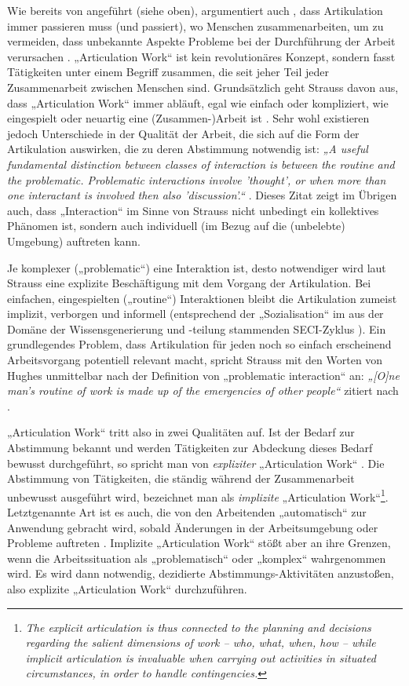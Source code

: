 Wie bereits von \citet{Gerson86} angeführt (siehe oben), argumentiert auch \citeauthor{Strauss88}, dass Artikulation immer passieren muss (und passiert), wo Menschen zusammenarbeiten, um zu vermeiden, dass unbekannte Aspekte Probleme bei der Durchführung der Arbeit verursachen \citep{Strauss88}. „Articulation Work“ ist kein revolutionäres Konzept, sondern fasst Tätigkeiten unter einem Begriff zusammen, die seit jeher Teil jeder Zusammenarbeit zwischen Menschen sind. Grundsätzlich geht Strauss davon aus, dass „Articulation Work“ immer abläuft, egal wie einfach oder kompliziert, wie eingespielt oder neuartig eine (Zusammen-)Arbeit ist \citep{Strauss88}. Sehr wohl existieren jedoch Unterschiede in der Qualität der Arbeit, die sich auf die Form der Artikulation auswirken, die zu deren Abstimmung notwendig ist: \emph{„A useful fundamental distinction between classes of interaction is between the routine and the problematic. Problematic interactions involve 'thought', or when more than one interactant is involved then also 'discussion'.“} \citep{Strauss93}. Dieses Zitat zeigt im Übrigen auch, dass „Interaction“ im Sinne von Strauss nicht unbedingt ein kollektives Phänomen ist, sondern auch individuell (im Bezug auf die (unbelebte) Umgebung) auftreten kann.

Je komplexer („problematic“) eine Interaktion ist, desto notwendiger wird laut Strauss eine explizite Beschäftigung mit dem Vorgang der Artikulation. Bei einfachen, eingespielten („routine“) Interaktionen bleibt die Artikulation zumeist implizit, verborgen und informell \citep{Hampson05} (entsprechend der „Sozialisation“ im aus der Domäne der Wissensgenerierung und -teilung stammenden SECI-Zyklus \citep{Nonaka95}). Ein grundlegendes Problem, dass Artikulation für jeden noch so einfach erscheinend Arbeitsvorgang potentiell relevant macht, spricht Strauss mit den Worten von Hughes unmittelbar nach der Definition von „problematic interaction“ an: \emph{„[O]ne man's routine of work is made up of the emergencies of other people“} \citep{Hughes71} zitiert nach \citep{Strauss93}.

„Articulation Work“ tritt also in zwei Qualitäten auf. Ist der Bedarf zur Abstimmung bekannt und werden Tätigkeiten zur Abdeckung dieses Bedarf bewusst durchgeführt, so spricht man von \emph{expliziter} „Articulation Work“ \citep{Strauss88} \citep{Fjuk97}. Die Abstimmung von Tätigkeiten, die ständig während der Zusammenarbeit unbewusst ausgeführt wird, bezeichnet man als \emph{implizite} „Articulation Work“\footnote{\emph{The explicit articulation is thus connected to the planning and decisions regarding the salient dimensions of work -- who, what, when, how -- while implicit articulation is invaluable when carrying out activities in situated circumstances, in order to handle contingencies.}\citep[][S.5]{Fjuk97}}. Letztgenannte Art ist es auch, die von den Arbeitenden „automatisch“ zur Anwendung gebracht wird, sobald Änderungen in der Arbeitsumgebung oder Probleme auftreten \citep{Strauss88}. Implizite „Articulation Work“ stößt aber an ihre Grenzen, wenn die Arbeitssituation als „problematisch“ \citep{Strauss88} oder „komplex“ \citep[][S. 23f]{Schmidt90} wahrgenommen wird. Es wird dann notwendig, dezidierte Abstimmungs-Aktivitäten anzustoßen, also explizite „Articulation Work“ durchzuführen.

